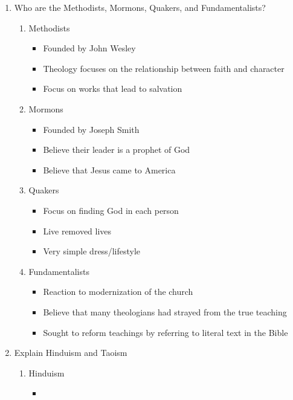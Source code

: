 \documentclass[8pt]{article}
\begin{document}
\begin{enumerate}
    \item Who are the Methodists, Mormons, Quakers, and Fundamentalists?
    \begin{enumerate}
        \item Methodists
        \begin{itemize}
            \item Founded by John Wesley
            \item Theology focuses on the relationship between faith and character
            \item Focus on works that lead to salvation
        \end{itemize}
        \item Mormons
        \begin{itemize}
            \item Founded by Joseph Smith
            \item Believe their leader is a prophet of God
            \item Believe that Jesus came to America
        \end{itemize}
        \item Quakers
        \begin{itemize}
            \item Focus on finding God in each person
            \item Live removed lives
            \item Very simple dress/lifestyle
        \end{itemize}
        \item Fundamentalists
        \begin{itemize}
            \item Reaction to modernization of the church
            \item Believe that many theologians had strayed from the true teaching
            \item Sought to reform teachings by referring to literal text in the Bible
        \end{itemize}
    \end{enumerate}

    \item Explain Hinduism and Taoism
    \begin{enumerate}
        \item Hinduism
        \begin{itemize}
            \item
        \end{itemize}
    \end{enumerate}
\end{enumerate}
\end{document}
